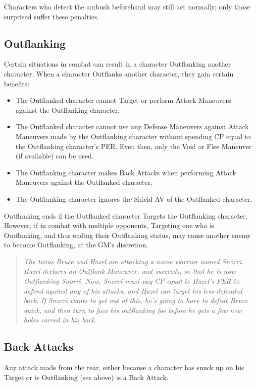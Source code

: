 \documentclass[oneside,11pt,english]{book}
\begin{document}
Characters who detect the ambush beforehand may still act normally; only those surprised suffer these penalties.

\subsection{Outflanking}
Certain situations in combat can result in a character Outflanking another character. When a character Outflanks another character, they gain certain benefits:
	\begin{itemize}
		\item The Outflanked character cannot Target or perform Attack Maneuvers against the Outflanking character.
		\item The Outflanked character cannot use any Defense Maneuvers against Attack Maneuvers made by the Outflanking character without spending CP equal to the Outflanking character’s PER. Even then, only the Void or Flee Maneuver (if available) can be used.
		\item The Outflanking character makes Back Attacks when performing Attack Maneuvers against the Outflanked character.
		\item The Outflanking character ignores the Shield AV of the Outflanked character.
	\end{itemize}
Outflanking ends if the Outflanked character Targets the Outflanking character. However, if in combat with multiple opponents, Targeting one who is Outflanking, and thus ending their Outflanking status, may cause another enemy to become Outflanking, at the GM’s discretion.
	\begin{quote}
		\emph{The twins Bruce and Hazel are attacking a norse warrior named Snorri. Hazel declares an Outflank Maneuver, and succeeds, so that he is now Outflanking Snorri. Now, Snorri must pay CP equal to Hazel’s PER to defend against any of his attacks, and Hazel can target his less-defended back. If Snorri wants to get out of this, he’s going to have to defeat Bruce quick, and then turn to face his outflanking foe before he gets a few new holes carved in his back.}
	\end{quote}

\subsection{Back Attacks} %
Any attack made from the rear, either because a character has snuck up on his Target or is Outflanking (see above) is a Back Attack.
\end{document}
